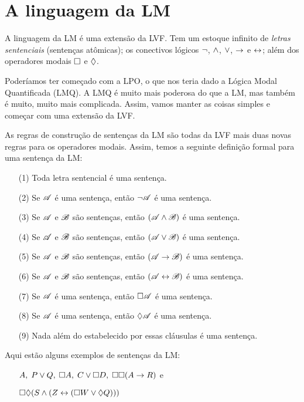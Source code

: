 \section{A linguagem da LM}
\label{TFLtoML}


A linguagem da LM é uma extensão da LVF. Tem um estoque infinito de \emph{letras sentenciais} (sentenças atômicas); os conectivos lógicos $\neg$, $\wedge$,  $\vee$,    $\rightarrow$  e $\leftrightarrow$; além dos  operadores modais  $\Box$ e $\Diamond$.


Poderíamos ter começado com a LPO, o que nos teria dado a Lógica Modal Quantificada (LMQ). A LMQ é muito mais poderosa do que a LM, mas também é muito, muito mais complicada. Assim,  vamos manter as coisas simples e começar com uma extensão da LVF. 

As regras de construção de  sentenças da LM são todas da LVF mais duas novas regras para os operadores modais. Assim, temos a seguinte definição formal para uma sentença da LM:
 
\begin{itemize}
	\item[(1)]Toda letra sentencial é uma sentença. 
	\item[(2)]Se $\mathscr{A}$ é uma sentença, então $\neg\mathscr{A}$ é uma sentença. 
	\item[(3)]Se $\mathscr{A}$ e $\mathscr{B}$ são sentenças, então $(\mathscr{A}\wedge\mathscr{B})$ é uma sentença.
	\item[(4)]Se $\mathscr{A}$ e $\mathscr{B}$ são sentenças, então $(\mathscr{A}\vee\mathscr{B})$ é uma sentença.
	\item[(5)]Se $\mathscr{A}$ e $\mathscr{B}$ são sentenças, então $(\mathscr{A}\rightarrow\mathscr{B})$ é uma sentença.
	\item[(6)]Se $\mathscr{A}$ e $\mathscr{B}$ são sentenças, então $(\mathscr{A}\leftrightarrow\mathscr{B})$ é uma sentença.
	\item[(7)]Se $\mathscr{A}$ é uma sentença, então $\Box\mathscr{A}$ é uma sentença.
	\item[(8)]Se $\mathscr{A}$ é uma sentença, então $\Diamond\mathscr{A}$ é uma sentença.
	\item[(9)]Nada além do estabelecido por essas cláusulas é uma sentença. 
\end{itemize}
Aqui estão alguns exemplos de sentenças  da LM:
\begin{itemize}
	\item[]$A,\;P\vee Q,\;\Box A,\;C\vee \Box D,\;\Box\Box (A\rightarrow R)$ e 
	\item[]$\Box\Diamond (S\wedge (Z\leftrightarrow (\Box W \vee \Diamond Q)))$
\end{itemize}


